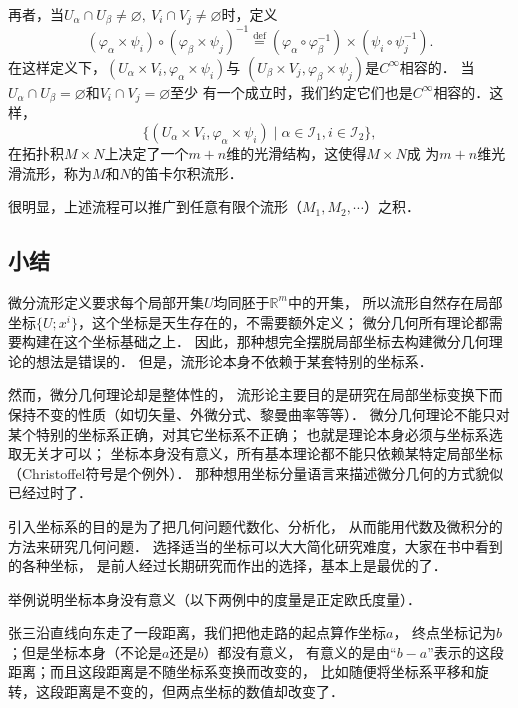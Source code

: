 
再者，当$U_\alpha \cap U_\beta \neq \varnothing,\ V_i\cap V_j\neq \varnothing$时，定义
\begin{equation}
    (\varphi_\alpha \times \psi_i)\circ (\varphi_\beta \times \psi_j)^{-1}
    \overset{\mathrm {def}}{=}(\varphi_\alpha\circ \varphi_\beta^{-1})\times
    (\psi_i\circ\psi_j^{-1}) .
\end{equation}
在这样定义下，$(U_\alpha\times V_i , \varphi_\alpha \times \psi_i)$与
$(U_\beta\times V_j , \varphi_\beta \times \psi_j)$是$C^\infty$相容的．
当$U_\alpha \cap U_\beta = \varnothing$和$V_i\cap V_j = \varnothing$至少
有一个成立时，我们约定它们也是$C^\infty$相容的．这样，
\begin{equation}
    \{(U_\alpha\times V_i , \varphi_\alpha \times \psi_i) \mid
    \alpha\in \mathscr{I}_1,i\in \mathscr{I}_2\} ,
\end{equation}
在拓扑积$M\times N$上决定了一个$m+n$维的光滑结构，这使得$M\times N$成
为$m+n$维光滑流形，称为$M$和$N$的笛卡尔{\heiti 积流形}．



很明显，上述流程可以推广到任意有限个流形（$M_1,M_2,\cdots$）之积．



\subsection{小结}\label{chdm:sec_tmpdmcon}
微分流形定义要求每个局部开集$U$均同胚于$\mathbb{R}^m$中的开集，
所以流形自然存在局部坐标$\{U;x^i\}$，这个坐标是天生存在的，不需要额外定义；
微分几何所有理论都需要构建在这个坐标基础之上．
因此，那种想完全摆脱局部坐标去构建微分几何理论的想法是错误的．
但是，流形论本身不依赖于某套特别的坐标系．

然而，微分几何理论却是整体性的，
流形论主要目的是研究在局部坐标变换下而保持不变的性质（如切矢量、外微分式、黎曼曲率等等）．
微分几何理论不能只对某个特别的坐标系正确，对其它坐标系不正确；
也就是理论本身必须与坐标系选取无关才可以；
坐标本身没有意义，所有基本理论都不能只依赖某特定局部坐标（Christoffel符号是个例外）．
那种想用坐标分量语言来描述微分几何的方式貌似已经过时了．



引入坐标系的目的是为了把几何问题代数化、分析化，
从而能用代数及微积分的方法来研究几何问题．
选择适当的坐标可以大大简化研究难度，大家在书中看到的各种坐标，
是前人经过长期研究而作出的选择，基本上是最优的了．


举例说明坐标本身没有意义（以下两例中的度量是正定欧氏度量）．
\begin{example}
    张三沿直线向东走了一段距离，我们把他走路的起点算作坐标$a$，
    终点坐标记为$b$；但是坐标本身（不论是$a$还是$b$）都没有意义，
    有意义的是由“$b-a$”表示的这段距离；而且这段距离是不随坐标系变换而改变的，
    比如随便将坐标系平移和旋转，这段距离是不变的，但两点坐标的数值却改变了．
\end{example}

